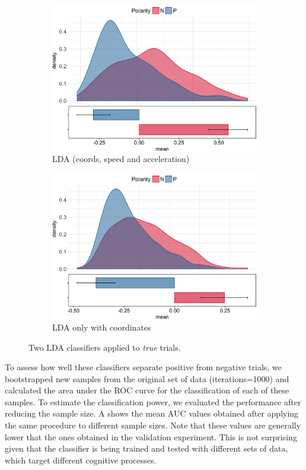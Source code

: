 \documentclass{article}
\begin{document}
\begin{figure}
\centering
\begin{subfigure}[b]{0.45\textwidth}
\includegraphics[width=\textwidth]{OriginalLDA-negation.png}
\caption{LDA (coords, speed and acceleration) }
\end{subfigure}
\begin{subfigure}[b]{0.45\textwidth}
\includegraphics[width=\textwidth]{CoordsLDA-negation.png}
\caption{LDA only with coordinates}
\end{subfigure}
\caption{Two LDA classifiers applied to \textit{true} trials. }
\label{fig:lda_negation}
\end{figure}

To assess how well these classifiers separate positive from negative trials, we bootstrapped new samples from the original set of data (iterations=1000) and calculated the area under the ROC curve for the classification of each of these samples. 
To estimate the classification power, we evaluated the performance after reducing the sample size. A shows the mean AUC values obtained after applying the same procedure to different sample sizes. 
Note that these values are generally lower that the ones obtained in the validation experiment. This is not surprising given that the classifier is being trained and tested with different sets of data, which target different cognitive processes. 
\end{document}
